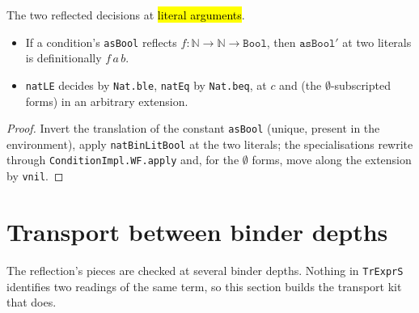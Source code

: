\begin{lemma}
  \label{prim-cond:family:reflect-apply-lit}
  \leanok

   The two reflected decisions at \hl{literal arguments}.
  \begin{itemize}
  \item If a condition's \texttt{asBool} reflects $f : \mathbb{N} \to \mathbb{N} \to \mathtt{Bool}$,
    then $\mathtt{asBool}'$ at two literals is definitionally $f\,a\,b$.
  \item \texttt{natLE} decides by \texttt{Nat.ble}, \texttt{natEq} by \texttt{Nat.beq}, at $c$ and
    (the $\emptyset$-subscripted forms) in an arbitrary extension.
  \end{itemize}
\end{lemma}
\begin{proof}
  \leanok
   Invert the translation of the constant \texttt{asBool} (unique, present in the
  environment), apply \texttt{natBinLitBool} at the two literals; the specialisations rewrite
  through \texttt{ConditionImpl.WF.apply} and, for the $\emptyset$ forms, move along the extension
  by \texttt{vnil}.
\end{proof}

\section{Transport between binder depths}

The reflection's pieces are checked at several binder depths. Nothing in \texttt{TrExprS}
identifies two readings of the same term, so this section builds the transport kit that does.

